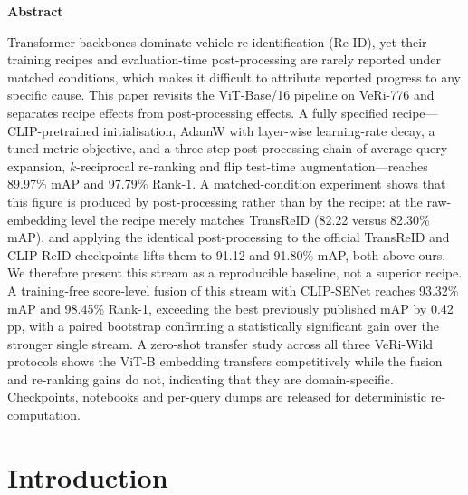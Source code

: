 \documentclass[10pt,a4paper]{article}
\begin{document}
\noindent\textbf{Abstract}\\[4pt]
{\small
Transformer backbones dominate vehicle re-identification (Re-ID), yet their
training recipes and evaluation-time post-processing are rarely reported under
matched conditions, which makes it difficult to attribute reported progress to
any specific cause. This paper revisits the ViT-Base/16 pipeline on VeRi-776
and separates recipe effects from post-processing effects. A fully specified
recipe---CLIP-pretrained initialisation, AdamW with layer-wise learning-rate
decay, a tuned metric objective, and a three-step post-processing chain of
average query expansion, $k$-reciprocal re-ranking and flip test-time
augmentation---reaches 89.97\% mAP and 97.79\% Rank-1. A matched-condition
experiment shows that this figure is produced by post-processing rather than by
the recipe: at the raw-embedding level the recipe merely matches TransReID
(82.22 versus 82.30\% mAP), and applying the identical post-processing to the
official TransReID and CLIP-ReID checkpoints lifts them to 91.12 and 91.80\%
mAP, both above ours. We therefore present this stream as a reproducible
baseline, not a superior recipe. A training-free score-level fusion of this
stream with CLIP-SENet reaches 93.32\% mAP and 98.45\% Rank-1, exceeding the
best previously published mAP by 0.42\,pp, with a paired bootstrap confirming a
statistically significant gain over the stronger single stream. A zero-shot
transfer study across all three VeRi-Wild protocols shows the ViT-B embedding
transfers competitively while the fusion and re-ranking gains do not,
indicating that they are domain-specific. Checkpoints, notebooks and per-query
dumps are released for deterministic re-computation.
\par}

\vspace{0.8em}

\vspace{1.2em}

\section{Introduction}
\label{sec:intro}
\end{document}
